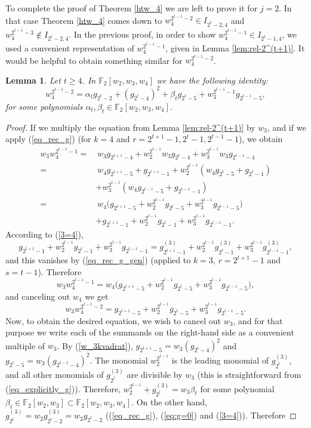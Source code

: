 \documentclass{amsart}
\newtheorem{lemma}[theorem]{Lemma}
\theoremstyle{definition}
\theoremstyle{remark}
\numberwithin{equation}{section}
\newcommand{\F}{\mathbb F}
\renewcommand{\ge}{\geqslant}
\begin{document}
To complete the proof of Theorem \ref{htw_4} we are left to prove it for $j=2$. In that case Theorem \ref{htw_4} comes down to $w_4^{2^{t-1}-2}\in I_{2^t-2,4}$ and $w_4^{2^{t-1}-3}\notin I_{2^t-2,4}$. In the previous proof, in order to show $w_4^{2^{t-1}-1}\in I_{2^t-1,4}$, we used a convenient representation of $w_4^{2^{t-1}-1}$, given in Lemma \ref{lem:rel-2^(t+1)}. It would be helpful to obtain something similar for $w_4^{2^{t-1}-2}$. 

\begin{lemma}\label{lem: uzas1}
    Let $t \ge 4$. In $\F_2[w_2,w_3,w_4]$ we have the following identity:
    \[w_4^{2^{t-1}-2} = \alpha_tg_{2^t-2}+ (g_{2^t-4})^2 + \beta_tg_{2^t-5}  + w_3^{2^{t-1}-1}  g_{2^{t-1} - 5},\] 
    for some polynomials $\alpha_t,\beta_t\in\F_2[w_2,w_3,w_4]$.
\end{lemma}
\begin{proof}
If we multiply the equation from Lemma \ref{lem:rel-2^(t+1)} by $w_3$, and if we apply (\ref{eq_rec_g}) (for $k=4$ and $r = 2^{t+1}-1, 2^t-1, 2^{t-1} -1$), we obtain
\begin{align*}
  w_3w_4^{2^{t-1}-1}=& \,w_3g_{2^{t+1}-4}+w_2^{2^{t-1}}w_3g_{2^t-4} + w_3^{2^{t-1}}w_3g_{2^{t-1}-4}\\
  =&\,w_4g_{2^{t+1}-5}+g_{2^{t+1}-1}+w_2^{2^{t-1}}(w_4g_{2^t-5}+g_{2^t-1}) \\
  &+ w_3^{2^{t-1}}(w_4g_{2^{t-1}-5}+g_{2^{t-1}-1})\\
  =&\,w_4\big(g_{2^{t+1}-5}+w_2^{2^{t-1}}g_{2^t-5} + w_3^{2^{t-1}}g_{2^{t-1}-5}\big)\\
  &+g_{2^{t+1}-1}+w_2^{2^{t-1}}g_{2^t-1} + w_3^{2^{t-1}}g_{2^{t-1}-1}.
  \end{align*}
  According to (\ref{3=4}), 
  \[g_{2^{t+1}-1}+w_2^{2^{t-1}}g_{2^t-1} + w_3^{2^{t-1}}g_{2^{t-1}-1}=g_{2^{t+1}-1}^{(3)}+w_2^{2^{t-1}}g_{2^t-1}^{(3)} + w_3^{2^{t-1}}g_{2^{t-1}-1}^{(3)},\] 
  and this vanishes by (\ref{eq_rec_g_gen}) (applied to $k=3$, $r=2^{t+1}-1$ and $s=t-1$). Therefore
  \[w_3w_4^{2^{t-1}-1}=w_4\big(g_{2^{t+1}-5}+w_2^{2^{t-1}}g_{2^t-5} + w_3^{2^{t-1}}g_{2^{t-1}-5}\big),\]
  and canceling out $w_4$ we get
  \begin{equation}\label{eqq}
     w_3w_4^{2^{t-1}-2}=g_{2^{t+1}-5}+w_2^{2^{t-1}}g_{2^t-5} + w_3^{2^{t-1}}g_{2^{t-1}-5}. 
  \end{equation}
Now, to obtain the desired equation, we wish to cancel out $w_3$, and for that purpose we write each of the summands on the right-hand side as a convenient multiple of $w_3$.
By (\ref{w_3kvadrat}), $g_{2^{t+1}-5}=w_3(g_{2^t-4})^2$ and $g_{2^t-5}=w_3(g_{2^{t-1}-4})^2$. The monomial $w_2^{2^{t-1}}$ is the leading monomial of $g_{2^t}^{(3)}$, and all other monomials of $g_{2^t}^{(3)}$ are divisible by $w_3$ (this is straightforward from (\ref{eq_explicitly_g})). Therefore, $w_2^{2^{t-1}}+g_{2^t}^{(3)}=w_3\beta_t$ for some polynomial $\beta_t\in\F_2[w_2,w_3]\subset\F_2[w_2,w_3,w_4]$. On the other hand, $g_{2^t}^{(3)}=w_2g_{2^t-2}^{(3)}=w_2g_{2^t-2}$ ((\ref{eq_rec_g}), (\ref{eq:g=0}) and (\ref{3=4})). Therefore

\end{proof}
\end{document}
